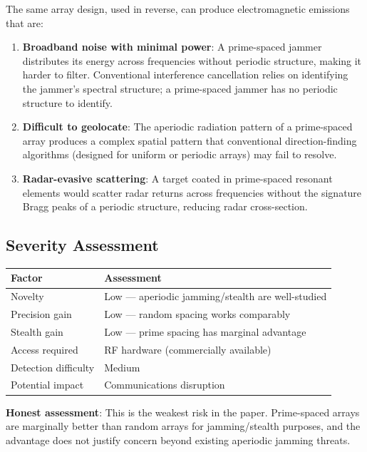\documentclass[11pt,a4paper]{article}
\begin{document}
The same array design, used in reverse, can produce electromagnetic
emissions that are:

\begin{enumerate}
  \item \textbf{Broadband noise with minimal power}: A prime-spaced
    jammer distributes its energy across frequencies without
    periodic structure, making it harder to filter. Conventional
    interference cancellation relies on identifying the jammer's
    spectral structure; a prime-spaced jammer has no periodic
    structure to identify.

  \item \textbf{Difficult to geolocate}: The aperiodic radiation
    pattern of a prime-spaced array produces a complex spatial
    pattern that conventional direction-finding algorithms
    (designed for uniform or periodic arrays) may fail to resolve.

  \item \textbf{Radar-evasive scattering}: A target coated in
    prime-spaced resonant elements would scatter radar returns
    across frequencies without the signature Bragg peaks of a
    periodic structure, reducing radar cross-section.
\end{enumerate}

\subsection{Severity Assessment}

\begin{center}
\begin{tabular}{@{}ll@{}}
\toprule
\textbf{Factor} & \textbf{Assessment} \\
\midrule
Novelty & Low --- aperiodic jamming/stealth are well-studied \\
Precision gain & Low --- random spacing works comparably \\
Stealth gain & Low --- prime spacing has marginal advantage \\
Access required & RF hardware (commercially available) \\
Detection difficulty & Medium \\
Potential impact & Communications disruption \\
\bottomrule
\end{tabular}
\end{center}

\textbf{Honest assessment}: This is the weakest risk in the paper.
Prime-spaced arrays are marginally better than random arrays for
jamming/stealth purposes, and the advantage does not justify
concern beyond existing aperiodic jamming threats.
\end{document}
